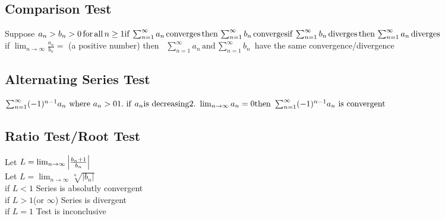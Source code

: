\documentclass[11pt]{article} %
\begin{document}
\subsection{Comparison Test}
Suppose
\begin{math}
a_{n}>b_{n}>0 \mathrm{\, for\, all\,} n\geq 1\\
\\
\mathrm{if} \, \sum_{n=1}^{\infty}a_{n} \, \mathrm{converges\, then} \, \sum_{n=1}^{\infty}b_{n} \, \mathrm{converges} \\
\mathrm{if} \, \sum_{n=1}^{\infty}b_{n} \, \mathrm{diverges\, then} \, \sum_{n=1}^{\infty}a_{n} \, \mathrm{diverges} \\
\end{math} \\
if 
\begin{math}
\lim_{n\to \infty} \frac{a_{n}}{b_{n}}= 
\end{math}
(a positive number)
then \,
\begin{math}
\sum_{n=1}^{\infty}a_{n} \, \mathrm{and} \, \sum_{n=1}^{\infty}b_{n} \,
\end{math}
have the same convergence/divergence
\subsection{Alternating Series Test}
\begin{math}
\sum_{n=1}^{\infty}(-1)^{n-1} a_{n} \ \mathrm{where} \ a_{n}>0 \\
\\
\mathrm{1. \ if} \ a_{n} \mathrm{is \ decreasing} \\
\mathrm{2. \ } \lim_{n\to \infty} a_{n}=0 \\
\\
\mathrm{then \ } \sum_{n=1}^{\infty}(-1)^{n-1} a_{n} \mathrm{ \ is \ convergent \ }
\end{math}
\subsection{Ratio Test/Root Test}
Let 
\begin{math}
L=\lim_{n\to \infty}\left | \frac{b_{n}+1}{b_{n}} \right | \\
\end{math}
\\
Let 
\begin{math}
L=\lim_{n\to \infty} \sqrt[n]{\left | b_{n} \right |}
\end{math} \\
if $L<1$ Series is absolutly convergent \\
if $L>1$(or $\infty$) Series is divergent \\
if $L=1$ Test is inconclusive
\end{document}
